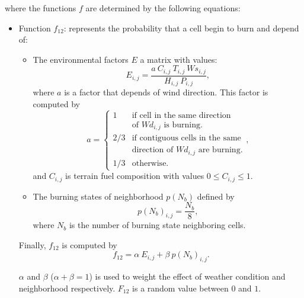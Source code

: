 \documentclass[conference]{IEEEtran}
\begin{document}
        where the functions $f$ are determined by the following equations:
        
        \begin{itemize}
          \item Function $f_{12}$: represents the probability that a cell begin to burn and depend of:
            \begin{itemize}
              \item The environmental factors $E$ a matrix with values:
                \begin{equation}
                  E_{i,j} = \frac{a ~ C_{i,j} ~ T_{i,j} ~ Ws_{i,j}}{H_{i,j} ~ P_{i,j}},
                \end{equation}
                where $a$ is a factor that depends of wind direction. This factor is computed by
                \begin{equation}
                  a = 
                  \begin{cases}
                    1 & \text{if cell in the same direction} \\
                     & \text{of $Wd_{i,j}$ is burning.}\\
                    2/3 & \text{if contiguous cells in the same} \\
                     & \text{direction of $Wd_{i,j}$ are burning.} \\
                    1/3 & \text{otherwise.}
                  \end{cases},
                \end{equation}
                and $C_{i,j}$ is terrain fuel composition with values $0\leq C_{i,j}\leq 1$.
              \item The burning states of neighborhood $p(N_b)$ defined by
                \begin{equation}
                    p(N_b)_{i,j} = \frac{N_b}{8},
                \end{equation}
                where $N_b$ is the number of burning state neighboring cells.
            \end{itemize}
            Finally, $f_{12}$ is computed by
            \begin{equation}
                f_{12} = \alpha ~ E_{i,j} + \beta ~ p(N_b)_{i,j}.
            \end{equation}
                
            $\alpha$ and $\beta$ ($\alpha+\beta = 1$) is used to weight the effect of weather condition 
            and neighborhood respectively. $F_{12}$ is a random value between $0$ and $1$.
              

\end{itemize}
\end{document}
